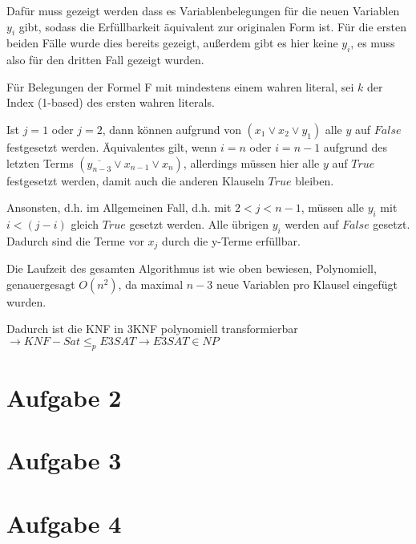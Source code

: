 \documentclass[a4paper,10pt,oneside,leqno]{scrartcl}
\begin{document}
Dafür muss gezeigt werden dass es Variablenbelegungen für die neuen Variablen $y_i$ gibt, sodass die Erfüllbarkeit äquivalent zur originalen Form ist. Für die ersten beiden Fälle wurde dies bereits gezeigt, außerdem gibt es hier keine $y_i$, es muss also für den dritten Fall gezeigt wurden.

Für Belegungen der Formel F mit mindestens einem wahren literal, sei $k$ der Index (1-based) des ersten wahren literals.

Ist $j=1$ oder $j=2$, dann können aufgrund von $(x_1 \vee x_2 \vee y_1)$ alle $y$ auf $False$ festgesetzt werden.
Äquivalentes gilt, wenn $i=n$ oder $i=n-1$ aufgrund des letzten Terms $(\overline{y_{n-3}} \vee x_{n-1} \vee x_{n})$, allerdings müssen hier alle $y$ auf $True$ festgesetzt werden, damit auch die anderen Klauseln $True$ bleiben.

Ansonsten, d.h. im Allgemeinen Fall, d.h. mit $2 < j < n-1$, müssen alle $y_i$ mit $i < (j-i)$ gleich $True$ gesetzt werden. Alle übrigen $y_i$ werden auf $False$ gesetzt. Dadurch sind die Terme vor $x_j$ durch die y-Terme erfüllbar.

Die Laufzeit des gesamten Algorithmus ist wie oben bewiesen, Polynomiell, genauergesagt $O(n^2)$, da maximal $n-3$ neue Variablen pro Klausel eingefügt wurden.

Dadurch ist die KNF in 3KNF polynomiell transformierbar $\rightarrow KNF-Sat \leq_p E3SAT \rightarrow E3SAT \in NP$

\section*{Aufgabe 2}%

\section*{Aufgabe 3}%

\section*{Aufgabe 4}%
\end{document}
